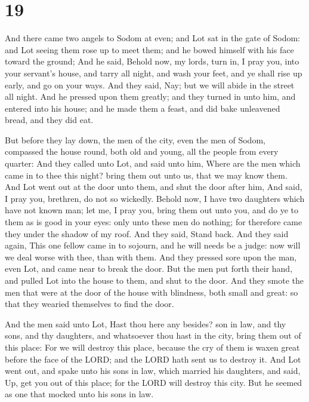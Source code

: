 \hypertarget{section-18}{%
\section{19}\label{section-18}}

 And there came two angels to Sodom at even; and Lot sat in
the gate of Sodom: and Lot seeing them rose up to meet them; and he
bowed himself with his face toward the ground;  And he said,
Behold now, my lords, turn in, I pray you, into your servant's house,
and tarry all night, and wash your feet, and ye shall rise up early, and
go on your ways. And they said, Nay; but we will abide in the street all
night.  And he pressed upon them greatly; and they turned in
unto him, and entered into his house; and he made them a feast, and did
bake unleavened bread, and they did eat.

 But before they lay down, the men of the city, even the
men of Sodom, compassed the house round, both old and young, all the
people from every quarter:  And they called unto Lot, and
said unto him, Where are the men which came in to thee this night? bring
them out unto us, that we may know them.  And Lot went out
at the door unto them, and shut the door after him,  And
said, I pray you, brethren, do not so wickedly.  Behold now,
I have two daughters which have not known man; let me, I pray you, bring
them out unto you, and do ye to them as is good in your eyes: only unto
these men do nothing; for therefore came they under the shadow of my
roof.  And they said, Stand back. And they said again, This
one fellow came in to sojourn, and he will needs be a judge: now will we
deal worse with thee, than with them. And they pressed sore upon the
man, even Lot, and came near to break the door.  But the
men put forth their hand, and pulled Lot into the house to them, and
shut to the door.  And they smote the men that were at the
door of the house with blindness, both small and great: so that they
wearied themselves to find the door.

 And the men said unto Lot, Hast thou here any besides?
son in law, and thy sons, and thy daughters, and whatsoever thou hast in
the city, bring them out of this place:  For we will
destroy this place, because the cry of them is waxen great before the
face of the LORD; and the LORD hath sent us to destroy it. 
And Lot went out, and spake unto his sons in law, which married his
daughters, and said, Up, get you out of this place; for the LORD will
destroy this city. But he seemed as one that mocked unto his sons in
law.

